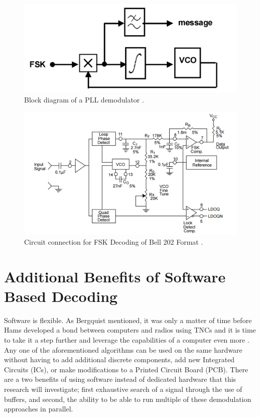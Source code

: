 \begin{figure}
  \centering
	\includegraphics[width=0.75\linewidth]{images/PLLBlockDiagram.PNG} 
	\caption{Block diagram of a PLL demodulator \cite{Roppel}.}
   \label{PLLBlockDiagram}
\end{figure}
\begin{figure}
  \centering
	\includegraphics[width=0.75\linewidth]{images/XR2211Circuit.PNG} 
	\caption{Circuit connection for FSK Decoding of Bell 202 Format \cite{EXAR1997}.}
   \label{XR2211Circuit}
\end{figure}

\section{Additional Benefits of Software Based Decoding}
Software is flexible. As Bergquist mentioned, it was only a matter of time before Hams developed a bond between computers and radios using TNCs and it is time to take it a step further and leverage the capabilities of a computer even more \cite{Bergquist2001}. Any one of the aforementioned algorithms can be used on the same hardware without having to add additional discrete components, add new Integrated Circuits (ICs), or make modifications to a Printed Circuit Board (PCB). There are a two benefits of using software instead of dedicated hardware that this research will investigate; first exhaustive search of a signal through the use of buffers, and second, the ability to be able to run multiple of these demodulation approaches in parallel.

